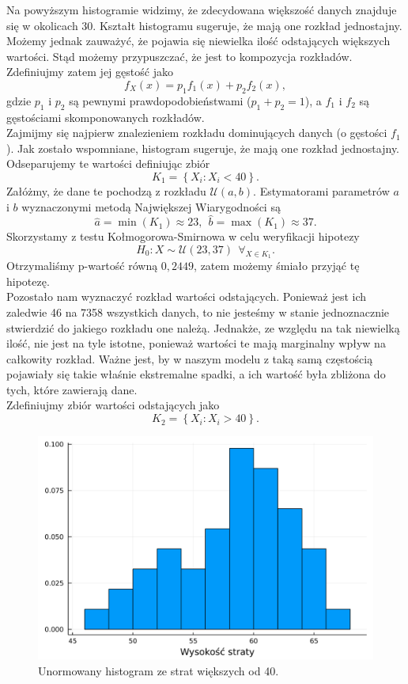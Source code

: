\documentclass[12pt]{mwart}
\begin{document}
	\noindent Na powyższym histogramie widzimy, że zdecydowana większość danych znajduje się w okolicach 30. Kształt histogramu sugeruje, że mają one rozkład jednostajny. Możemy jednak zauważyć, że pojawia się niewielka ilość odstających większych wartości. Stąd możemy przypuszczać, że jest to kompozycja rozkładów. Zdefiniujmy zatem jej gęstość jako
	\begin{equation}\label{gęstość_strat}
		f_X(x) = p_1 f_1(x) + p_2 f_2(x),
	\end{equation}
	gdzie $p_1$ i $p_2$ są pewnymi prawdopodobieństwami ($p_1 + p_2 = 1$), a $f_1$ i $f_2$ są gęstościami skomponowanych rozkładów.
	\vspace{1.5mm}\\
	Zajmijmy się najpierw znalezieniem rozkładu dominujących danych (o gęstości $f_1$). Jak zostało wspomniane, histogram sugeruje, że mają one rozkład jednostajny. Odseparujemy te wartości definiując zbiór
	$$ K_1 = \left\{ X_i: X_i < 40 \right\}. $$
	Załóżmy, że dane te pochodzą z rozkładu $\mathcal{U}(a, b)$. Estymatorami parametrów $a$ i $b$ wyznaczonymi metodą Największej Wiarygodności są
	$$ \widehat{a} = \min(K_1) \approx 23, \ \ \widehat{b} = \max(K_1) \approx 37. $$
	Skorzystamy z testu Kołmogorowa-Smirnowa w celu weryfikacji hipotezy
	$$ H_0: X \sim \mathcal{U}(23, 37) \ \ \forall_{X \in K_1}. $$
	Otrzymaliśmy p-wartość równą $0,2449$, zatem możemy śmiało przyjąć tę hipotezę.
	\vspace{1.5mm}\\
	Pozostało nam wyznaczyć rozkład wartości odstających. Ponieważ jest ich zaledwie 46 na 7358 wszystkich danych, to nie jesteśmy w stanie jednoznacznie stwierdzić do jakiego rozkładu one należą. Jednakże, ze względu na tak niewielką ilość, nie jest na tyle istotne, ponieważ wartości te mają marginalny wpływ na całkowity rozkład. Ważne jest, by w naszym modelu z taką samą częstością pojawiały się takie właśnie ekstremalne spadki, a ich wartość była zbliżona do tych, które zawierają dane.
	\vspace{1.5mm}\\
	Zdefiniujmy zbiór wartości odstających jako
	$$ K_2 = \left\{ X_i: X_i > 40 \right\}. $$
	
	\begin{figure}[H]\label{odstające}
		\centering
		\includegraphics[width=\columnwidth]{fig/straty_2.pdf}
		\caption{Unormowany histogram ze strat większych od 40.}
	\end{figure}
\end{document}
